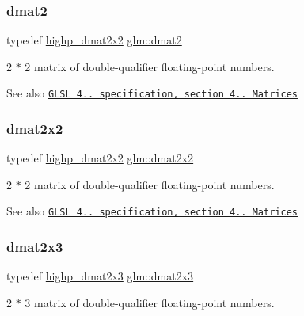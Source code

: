 \subsubsection{\texorpdfstring{dmat2}{dmat2}}
{\footnotesize\ttfamily typedef \mbox{\hyperlink{group__core__precision_gad08aec6bf6b5ae7d486fbabb3b28f904}{highp\+\_\+dmat2x2}} \mbox{\hyperlink{group__core__types_gad8c130d26c4cd9a1a831c1a74292a8f6}{glm\+::dmat2}}}

2 $\ast$ 2 matrix of double-\/qualifier floating-\/point numbers.

\begin{DoxySeeAlso}{See also}
\href{http://www.opengl.org/registry/doc/GLSLangSpec.4.20.8.pdf}{\tt G\+L\+SL 4.. specification, section 4.. Matrices} 
\end{DoxySeeAlso}
\mbox{\label{group__core__types_gae9932771e11a4f38e21f1136423bab18}} 
\subsubsection{\texorpdfstring{dmat2x2}{dmat2x2}}
{\footnotesize\ttfamily typedef \mbox{\hyperlink{group__core__precision_gad08aec6bf6b5ae7d486fbabb3b28f904}{highp\+\_\+dmat2x2}} \mbox{\hyperlink{group__core__types_gae9932771e11a4f38e21f1136423bab18}{glm\+::dmat2x2}}}

2 $\ast$ 2 matrix of double-\/qualifier floating-\/point numbers.

\begin{DoxySeeAlso}{See also}
\href{http://www.opengl.org/registry/doc/GLSLangSpec.4.20.8.pdf}{\tt G\+L\+SL 4.. specification, section 4.. Matrices} 
\end{DoxySeeAlso}
\mbox{\label{group__core__types_ga6b5ff9888ca0e468f35b637d4c3a361d}} 
\subsubsection{\texorpdfstring{dmat2x3}{dmat2x3}}
{\footnotesize\ttfamily typedef \mbox{\hyperlink{group__core__precision_gad7de433cb7f79959a191fc5c64fbfc4e}{highp\+\_\+dmat2x3}} \mbox{\hyperlink{group__core__types_ga6b5ff9888ca0e468f35b637d4c3a361d}{glm\+::dmat2x3}}}

2 $\ast$ 3 matrix of double-\/qualifier floating-\/point numbers.

